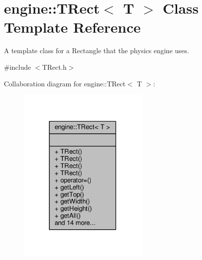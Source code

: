 \hypertarget{classengine_1_1TRect}{\section{engine\-:\-:T\-Rect$<$ T $>$ Class Template Reference}
\label{classengine_1_1TRect}
}


A template class for a Rectangle that the physics engine uses.  




{\ttfamily \#include $<$T\-Rect.\-h$>$}



Collaboration diagram for engine\-:\-:T\-Rect$<$ T $>$\-:
\nopagebreak
\begin{figure}[H]
\begin{center}
\leavevmode
\includegraphics[width=182pt]{classengine_1_1TRect__coll__graph}
\end{center}
\end{figure}
